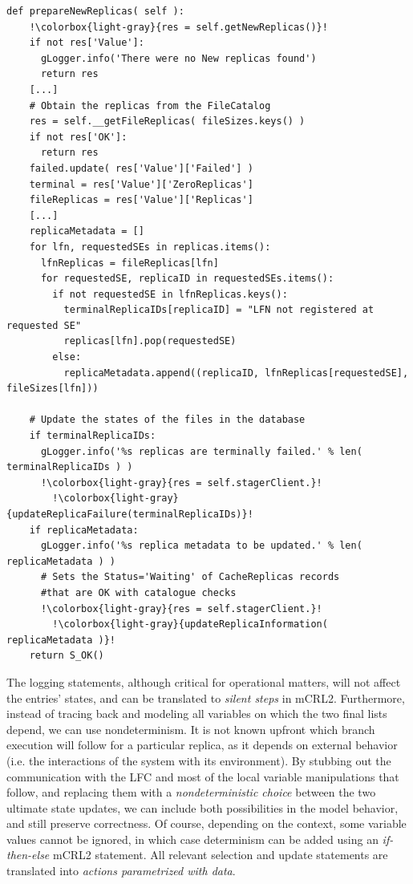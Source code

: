 \documentclass[10pt,conference]{IEEEtran}
\begin{document}
\begin{lstlisting}[float=tp,escapechar=!,basicstyle=\ttfamily\fontsize{7}{7}\ \selectfont]
  def prepareNewReplicas( self ):
    !\colorbox{light-gray}{res = self.getNewReplicas()}!
    if not res['Value']:
      gLogger.info('There were no New replicas found')
      return res
    [...]
    # Obtain the replicas from the FileCatalog
    res = self.__getFileReplicas( fileSizes.keys() )
    if not res['OK']:
      return res
    failed.update( res['Value']['Failed'] )
    terminal = res['Value']['ZeroReplicas']
    fileReplicas = res['Value']['Replicas']
    [...]
    replicaMetadata = []
    for lfn, requestedSEs in replicas.items():
      lfnReplicas = fileReplicas[lfn]
      for requestedSE, replicaID in requestedSEs.items():
        if not requestedSE in lfnReplicas.keys():
          terminalReplicaIDs[replicaID] = "LFN not registered at requested SE"
          replicas[lfn].pop(requestedSE)
        else:
          replicaMetadata.append((replicaID, lfnReplicas[requestedSE], fileSizes[lfn]))

    # Update the states of the files in the database
    if terminalReplicaIDs:
      gLogger.info('%s replicas are terminally failed.' % len( terminalReplicaIDs ) )
      !\colorbox{light-gray}{res = self.stagerClient.}!
	    !\colorbox{light-gray}{updateReplicaFailure(terminalReplicaIDs)}!
    if replicaMetadata:
      gLogger.info('%s replica metadata to be updated.' % len( replicaMetadata ) )
      # Sets the Status='Waiting' of CacheReplicas records 
      #that are OK with catalogue checks
      !\colorbox{light-gray}{res = self.stagerClient.}!
	    !\colorbox{light-gray}{updateReplicaInformation( replicaMetadata )}!
    return S_OK()
\end{lstlisting}

The logging statements, although critical for operational matters, will
not affect the entries' states, and can be translated to \textit{silent steps} in mCRL2.
Furthermore, instead of tracing back and modeling all variables on which 
the two final lists depend, we can use nondeterminism. 
It is not known upfront which branch execution will follow
for a particular replica, as it depends on external behavior (i.e. the interactions of the system with its environment).
By stubbing out the communication with the LFC and
most of the local variable manipulations 
that follow, and replacing them with a \textit{nondeterministic choice} between the two
ultimate state updates, we can include both possibilities in the model behavior,
and still preserve correctness. Of course, depending on the context, some 
variable values cannot be ignored, in which case determinism can be added
using an \textit{if-then-else} mCRL2 statement. All relevant selection and update 
statements are translated into \textit{actions parametrized with data}.
\end{document}

